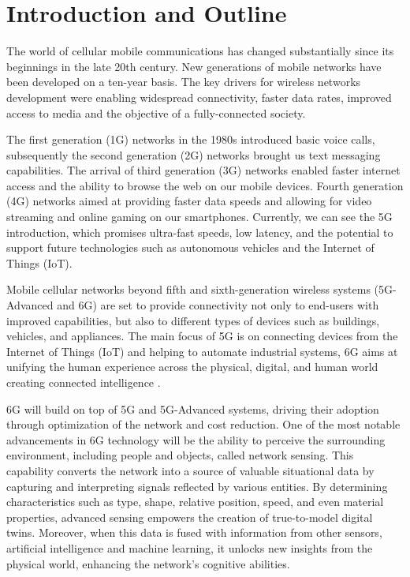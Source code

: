 \chapter{Introduction and Outline}
\label{chap_intro}

The world of cellular mobile communications has changed substantially since its beginnings in the late 20th century.
New generations of mobile networks have been developed on a ten-year basis. The key drivers for wireless networks development were enabling widespread connectivity, faster data rates, improved access to media and the objective of a fully-connected society.

The first generation (1G) networks in the 1980s introduced basic voice calls, subsequently the second generation (2G) networks brought us text messaging capabilities. The arrival of third generation (3G) networks enabled faster internet access and the ability to browse the web on our mobile devices. 
Fourth generation (4G) networks aimed at providing faster data speeds and allowing for video streaming and online gaming on our smartphones. 
Currently, we can see the \gls{5G} introduction, which promises ultra-fast speeds, low latency, and the potential to support future technologies such as autonomous vehicles and the Internet of Things (IoT). 

Mobile cellular networks beyond fifth and sixth-generation wireless systems (\gls{5G}-Advanced and 6G) are set to provide connectivity not only to end-users with improved capabilities, but also to different types of devices such as buildings, vehicles, and appliances.
The main focus of \gls{5G} is on connecting devices from the Internet of Things (IoT) and helping to automate industrial systems, 6G aims at unifying the human experience across the physical, digital, and human world creating connected intelligence \cite{6G-explained-NOKIA}.


6G will build on top of \gls{5G} and \gls{5G}-Advanced systems, driving their adoption through optimization of the network and cost reduction. 
One of the most notable advancements in 6G technology will be the ability to perceive the surrounding environment, including people and objects, called network sensing. This capability converts the network into a source of valuable situational data by capturing and interpreting signals reflected by various entities. 
By determining characteristics such as type, shape, relative position, speed, and even material properties, advanced sensing empowers the creation of true-to-model digital twins.
Moreover, when this data is fused with information from other sensors, artificial intelligence and machine learning, it unlocks new insights from the physical world, enhancing the network's cognitive abilities.


